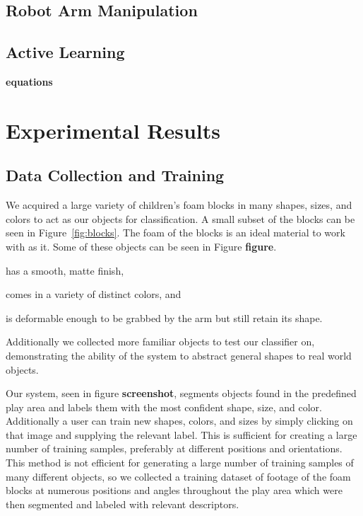 \documentclass[11pt]{article}
\newcommand{\xxx}[1]{{\bf \color{red} #1}}
\newcommand{\meh}[1]{{\bf \color{blue} #1}}
\begin{document}
\subsection{Robot Arm Manipulation}

\subsection{Active Learning}


\xxx{equations}
\section{Experimental Results}

\subsection{Data Collection and Training}
We acquired a large variety of children's foam blocks in many shapes, sizes,
and colors to act as our objects for classification. A small subset of the
blocks can be seen in Figure~\ref{fig:blocks}. The foam of the blocks is an
ideal material to work with as it. Some of these
objects can be seen in Figure \meh{figure}.
\begin{inparaenum}[(1)]
\item has a smooth, matte finish,
\item comes in a variety of distinct colors, and
\item is deformable enough to be grabbed by the arm but still retain its
shape.
\end{inparaenum}
Additionally we collected
more familiar objects to test our classifier on, demonstrating the ability of
the system to abstract general shapes to real world objects.


Our system, seen in figure \meh{screenshot}, segments objects found in the
predefined play area and labels them with the most confident shape, size, and
color.  Additionally a user can train new shapes, colors, and sizes by simply
clicking on that image and supplying the relevant label.  This is sufficient
for creating a large number of training samples, preferably at different
positions and orientations.  This method is not efficient for generating a
large number of training samples of many different objects, so we collected a
training dataset of footage of the foam blocks at numerous positions and angles
throughout the play area which were then segmented and labeled with relevant
descriptors.
\end{document}
